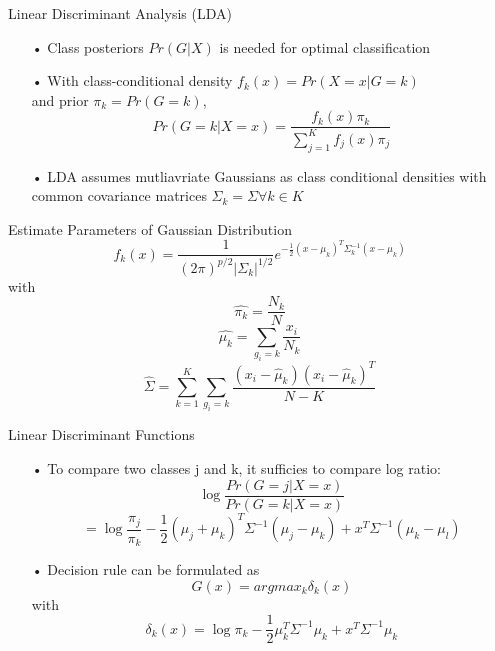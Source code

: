 \documentclass{beamer}
\begin{document}
\begin{frame}{Linear Discriminant Analysis (LDA)}
\begin{itemize}
\item[•] Class posteriors $Pr(G|X)$ is needed for optimal classification
\item[•] With class-conditional density $f_k(x)=Pr(X=x|G=k)$ \\ and prior $\pi_k = Pr(G=k)$, 
\begin{equation*}
Pr(G=k|X=x)=\frac{f_k(x)\pi_k}{\sum_{j=1}^{K}f_j(x)\pi_j}
\end{equation*}
\item[•] LDA assumes mutliavriate Gaussians as class conditional densities with common covariance matrices $\Sigma_k = \Sigma \forall k \in K$
\end{itemize}
\end{frame}

\begin{frame}{Estimate Parameters of Gaussian Distribution}
\begin{equation*}
f_k(x)=\frac{1}{(2\pi)^{p/2}|\Sigma_k|^{1/2}}e^{-\frac{1}{2}(x-\mu_k)^T\Sigma_k^{-1}(x-\mu_k)}
\end{equation*}
with
\begin{equation*}
\hat{\pi_k} = \frac{N_k}{N}
\end{equation*}
\begin{equation*}
\hat{\mu_k}=\sum_{g_i=k}\frac{x_i}{N_k}
\end{equation*}
\begin{equation*}
\hat{\Sigma}=\sum_{k=1}^K\sum_{g_i=k}\frac{(x_i-\hat{\mu}_k)(x_i-\hat{\mu}_k)^T}{N-K}
\end{equation*}
\end{frame}

\begin{frame}{Linear Discriminant Functions}
\begin{itemize}
\item[•] To compare two classes j and k, it sufficies to compare log ratio:
\begin{equation*}
\log\frac{Pr(G=j|X=x)}{Pr(G=k|X=x)} 
\end{equation*}
\begin{equation*}
= \log\frac{\pi_j}{\pi_k}-\frac{1}{2}(\mu_j+\mu_k)^T\Sigma^{-1}(\mu_j-\mu_k) + x^T \Sigma^{-1}(\mu_k-\mu_l)
\end{equation*}
\item[•] Decision rule can be formulated as 
\begin{equation*}
G(x) = argmax_k\delta_k(x)
\end{equation*}
with
\begin{equation*}
\delta_k(x) = \log\pi_k-\frac{1}{2}\mu_k^T\Sigma^{-1}\mu_k+x^T\Sigma^{-1}\mu_k
\end{equation*}
\end{itemize}
\end{frame}
\end{document}
